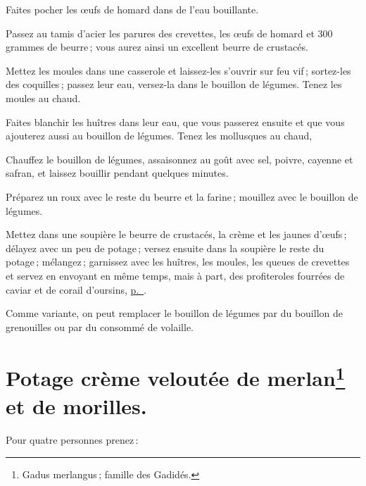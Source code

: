 Faites pocher les œufs de homard dans de l'eau bouillante.

Passez au tamis d'acier les parures des crevettes, les œufs de homard et 300
grammes de beurre ; vous aurez ainsi un excellent beurre de crustacés.

Mettez les moules dans une casserole et laissez-les s'ouvrir sur feu vif ;
sortez-les des coquilles ; passez leur eau, versez-la dans le bouillon de
légumes. Tenez les moules au chaud.

Faites blanchir les huîtres dans leur eau, que vous passerez ensuite et que
vous ajouterez aussi au bouillon de légumes. Tenez les mollusques au chaud,

Chauffez le bouillon de légumes, assaisonnez au goût avec sel, poivre, cayenne
et safran, et laissez bouillir pendant quelques minutes.

Préparez un roux avec le reste du beurre et la farine ; mouillez avec le
bouillon de légumes.

Mettez dans une soupière le beurre de crustacés, la crème et les jaunes
d'œufs ; délayez avec un peu de potage ; versez ensuite dans la soupière le
reste du potage ; mélangez ; garnissez avec les huîtres, les moules, les queues
de crevettes et servez en envoyant en même temps, mais à part, des profiteroles
fourrées de caviar et de corail d'oursins, \hyperlink{p0258}{p. \pageref{pg0258}}.

\sk

Comme variante, on peut remplacer le bouillon de légumes par du bouillon de
grenouilles ou par du consommé de volaille.

\section*{\centering Potage crème veloutée de merlan\footnote{Gadus merlangus ; famille des Gadidés.} et de morilles.} 


Pour quatre personnes prenez :

\medskip

